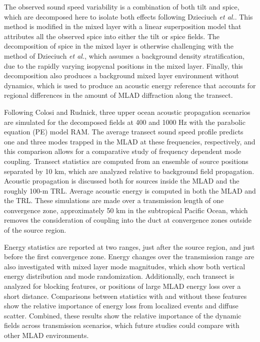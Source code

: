 \documentclass[preprint,NumberedRefs]{JASA}
\begin{document}
The observed sound speed variability is a combination of both tilt and spice, which are decomposed here to isolate both effects following Dzieciuch \emph{et al.}\citep{dzieciuch2004}. This method is modified in the mixed layer with a linear superposition model that attributes all the observed spice into either the tilt or spice fields. The decomposition of spice in the mixed layer is otherwise challenging with the method of Dzieciuch \emph{et al.}\cite{dzieciuch2004}, which assumes a background density stratification, due to the rapidly varying isopycnal positions in the mixed layer. Finally, this decomposition also produces a background mixed layer environment without dynamics, which is used to produce an acoustic energy reference that accounts for regional differences in the amount of MLAD diffraction along the transect.

Following Colosi and Rudnick\cite{colosi2020observations}, three upper ocean acoustic propagation scenarios are simulated for the decomposed fields at 400 and 1000 Hz with the parabolic equation (PE) model RAM\cite{collins93}. The average transect sound speed profile predicts one and three modes trapped in the MLAD at these frequencies, respectively, and this comparison allows for a comparative study of frequency dependent mode coupling. Transect statistics are computed from an ensemble of source positions separated by 10 km, which are analyzed relative to background field propagation. Acoustic propagation is discussed both for sources inside the MLAD and the roughly 100-m TRL. Average acoustic energy is computed in both the MLAD and the TRL. These simulations are made over a transmission length of one convergence zone\citep{jensen2011computational}, approximately 50 km in the subtropical Pacific Ocean, which removes the consideration of coupling into the duct at convergence zones outside of the source region\citep{colosi2020observations}.

Energy statistics are reported at two ranges, just after the source region, and just before the first convergence zone. Energy changes over the transmission range are also investigated with mixed layer mode magnitudes, which show both vertical energy distribution and mode randomization. Additionally, each transect is analyzed for blocking features\citep{colosi2020observations}, or positions of large MLAD energy loss over a short distance. Comparisons between statistics with and without these features show the relative importance of energy loss from localized events and diffuse scatter. Combined, these results show the relative importance of the dynamic fields across transmission scenarios, which future studies could compare with other MLAD environments.
\end{document}
